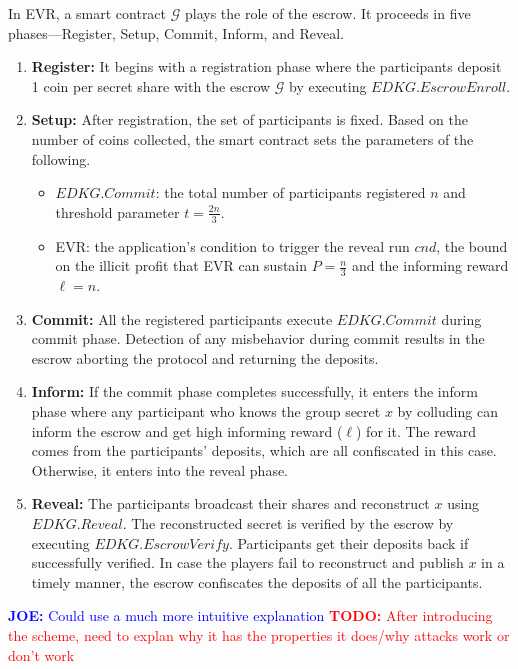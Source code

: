 \documentclass[letterpaper,twocolumn,10pt]{article}
\theoremstyle{definition}
\theoremstyle{remark}
\newcommand{\todo}[1]{\textcolor{red}{\textbf{TODO:} #1}}
\newcommand{\joenote}[1]{\textcolor{blue}{\textbf{JOE:} #1}}
\begin{document}
In EVR, a smart contract $\mathcal{G}$ plays the role of the escrow. It proceeds in five phases---Register, Setup, Commit, Inform, and Reveal.
\begin{enumerate}
    \item \textbf{Register:} It begins with a registration phase where the participants deposit 1 coin per secret share with the escrow $\mathcal{G}$ by executing $EDKG.EscrowEnroll$.
    \item \textbf{Setup:} After registration, the set of participants is fixed. Based on the number of coins collected, the smart contract sets the parameters of the following.
    \begin{itemize}
        \item $EDKG.Commit$: the total number of participants registered $n$ and threshold parameter $t = \frac{2n}{3}$.
        \item EVR: the application's condition to trigger the reveal run $cnd$, the bound on the illicit profit that EVR can sustain $P=\frac{n}{3}$ and the informing reward $\ell = n$.
    \end{itemize}
    \item \textbf{Commit:} All the registered participants execute $EDKG.Commit$ during commit phase. Detection of any misbehavior during commit results in the escrow aborting the protocol and returning the deposits.
 \item \textbf{Inform:} If the commit phase completes successfully, it enters the inform phase where any participant who knows the group secret $x$ by colluding can inform the escrow and get high informing reward ($\ell$) for it. The reward comes from the participants’ deposits, which are all confiscated in this case. Otherwise, it enters into the reveal phase.
    \item \textbf{Reveal:} The participants broadcast their shares and reconstruct $x$ using $EDKG.Reveal$. The reconstructed secret is verified by the escrow by executing $EDKG.EscrowVerify$. Participants get their deposits back if successfully verified. In case the players fail to reconstruct and publish $x$ in a timely manner, the escrow confiscates the deposits of all the participants.
\end{enumerate}

\joenote{Could use a much more intuitive explanation}
\todo{After introducing the scheme, need to explan why it has the properties it does/why attacks work or don't work}
\end{document}

